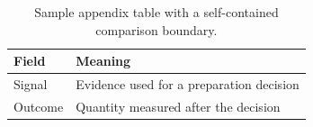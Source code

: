 \begin{table}[t]
\centering
\caption{Sample appendix table with a self-contained comparison boundary.}
\label{tab:sample-appendix}
\begin{tabular}{ll}
\toprule
Field & Meaning \\
\midrule
Signal & Evidence used for a preparation decision \\
Outcome & Quantity measured after the decision \\
\bottomrule
\end{tabular}
\end{table}
